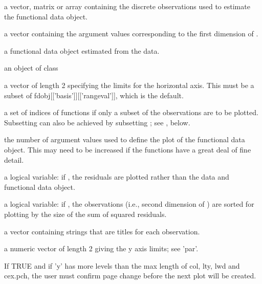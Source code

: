 \documentclass{article}
\begin{document}
\begin{Arguments}
\begin{ldescription}
\item[\code{y}] a vector, matrix or array containing the discrete observations used
to estimate the functional data object. 

\item[\code{argvals}] a vector containing the argument values corresponding to the first
dimension of . 

\item[\code{fdobj}] a functional data object estimated from the data.

\item[\code{fdSm}] an object of class  
\item[\code{rng}] a vector of length 2 specifying the limits for the horizontal axis.
This must be a subset of fdobj[['basis']][['rangeval']], which is
the default. 

\item[\code{index}] a set of indices of functions if only a subset of the observations
are to be plotted.  Subsetting can also be achieved by subsetting
;  see , below.  

\item[\code{nfine}] the number of argument values used to define the plot of the
functional data object.  This may need to be increased if the
functions have a great deal of fine detail. 

\item[\code{residual}] a logical variable:  if , the residuals are plotted
rather than the data and functional data object.

\item[\code{sortwrd}] a logical variable:  if , the observations (i.e., second
dimension of ) are sorted for plotting by the size of the
sum of squared residuals. 

\item[\code{titles}] a vector containing strings that are titles for each observation.

\item[\code{ylim}] a numeric vector of length 2 giving the y axis limits;  see 'par'.  

\item[\code{ask}] If TRUE and if 'y' has more levels than the max length of col, lty,
lwd and cex.pch, the user must confirm page change before the next
plot will be created.


\end{ldescription}
\end{Arguments}
\end{document}
